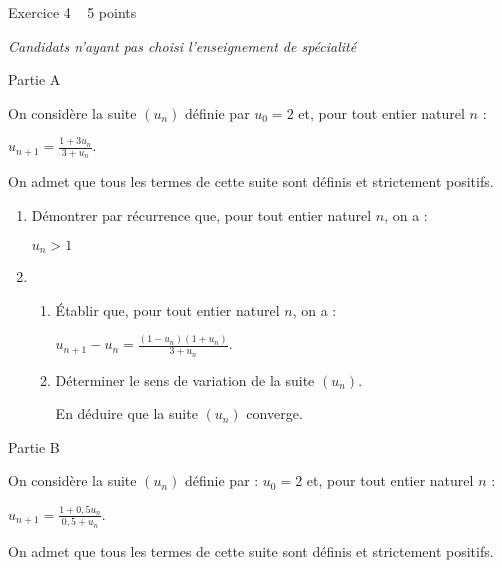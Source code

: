 
%
\begin{h2}Exercice 4   5 points\end{h2}
\textit{Candidats n'ayant pas choisi l'enseignement de spécialité}
\begin{h3}Partie A\end{h3}
On considère la suite $\left(u_{n}\right)$ définie par $u_{0}=2$ et, pour tout entier naturel $n$ :
\begin{center}$u_{n+1}=\frac{1+3u_{n}}{3+u_{n}}.$\end{center}
On admet que tous les termes de cette suite sont définis et strictement positifs.
\begin{enumerate}
     \item
     Démontrer par récurrence que, pour tout entier naturel $n$, on a :
     \begin{center}$u_{n} > 1$\end{center}
     \item
     \begin{enumerate}
          \item
          Établir que, pour tout entier naturel $n$, on a :
          \begin{center}$u_{n+1}- u_{n}=\frac{\left(1-u_{n} \right)\left(1+u_{n}\right)}{3+ u_{n}}$.\end{center}
          \item
          Déterminer le sens de variation de la suite $\left(u_{n}\right)$.
          \par
          En déduire que la suite $\left(u_{n}\right)$ converge.
     \end{enumerate}
\end{enumerate}
\begin{h3}Partie B\end{h3}
On considère la suite $\left(u_{n}\right)$ définie par : $u_{0}=2$ et, pour tout entier naturel $n$ :
\begin{center}$ u_{n+1}=\frac{1+0,5u_{n}}{0,5+u_{n}}.$\end{center}
On admet que tous les termes de cette suite sont définis et strictement positifs.
